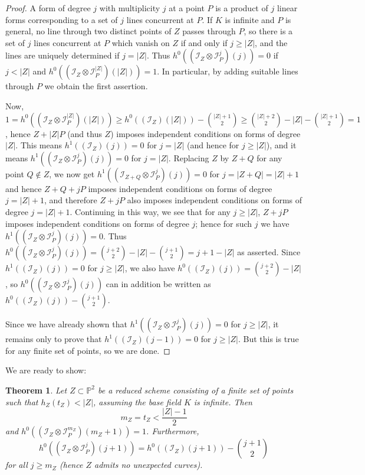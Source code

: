 \documentclass[12pt]{amsart}
\numberwithin{equation}{section}
\newtheorem{theorem}{Theorem}[section]
\theoremstyle{definition}
\begin{document}
\begin{proof} A form of degree $j$ with multiplicity $j$ at a point $P$ is a product of $j$ 
linear forms corresponding to  a set of $j$ lines concurrent at $P$. If $K$ is infinite and 
$P$ is general, no line through two distinct points of $Z$ passes  through $P$, so
there is a set of $j$ lines concurrent at $P$ which vanish on $Z$ if and only if $j\geq |Z|$, 
and the lines are uniquely determined if $j=|Z|$. 
Thus $h^0((\mathcal I_Z \otimes \mathcal I_P^{j})(j)) = 0$ if $j<|Z|$ and
$h^0((\mathcal I_Z \otimes \mathcal I_P^{|Z|})(|Z|)) = 1$. In particular, by adding suitable lines through $P$ we obtain the first assertion.

Now, 
$1=h^0((\mathcal I_Z \otimes \mathcal I_P^{|Z|})(|Z|))\geq 
h^0((\mathcal I_Z)(|Z|))-\binom{|Z|+1}{2}\geq \binom{|Z|+2}{2}-|Z|-\binom{|Z|+1}{2} = 1$,
hence $Z+|Z|P$ (and thus $Z$) imposes independent conditions on forms of degree $|Z|$.
This means $h^1((\mathcal I_Z)(j)) = 0$ for $j=|Z|$ (and hence for $j\geq |Z|$), and it means
$h^1((\mathcal I_Z \otimes \mathcal I_P^j)(j)) = 0$ for $j = |Z|$.
Replacing $Z$ by $Z+Q$ for any point $Q\notin Z$, we now get
$h^1((\mathcal I_{Z+Q} \otimes \mathcal I_P^j)(j)) = 0$ for $j = |Z+Q|=|Z|+1$ and hence
$Z+Q+jP$ imposes independent conditions on forms of degree $j=|Z|+1$, and therefore
$Z+jP$ also imposes independent conditions on forms of degree $j=|Z|+1$.
Continuing in this way, we see that for any $j \geq |Z|$, $Z + jP$ imposes independent conditions on forms of degree $j$; hence for such $j$ we have $h^1((\mathcal I_Z \otimes \mathcal I_P^j)(j)) = 0$. Thus $h^0((\mathcal I_Z \otimes \mathcal I_P^j)(j)) = \binom{j+2}{2}-|Z|-\binom{j+1}{2}=j+1-|Z|$  as asserted. Since $h^1((\mathcal I_Z)(j)) = 0$ for $j\geq|Z|$, we also have
$h^0((\mathcal I_Z)(j)) = \binom{j+2}{2}-|Z|$, so $h^0((\mathcal I_Z \otimes \mathcal I_P^j)(j))$
can in addition be written as $h^0((\mathcal I_Z)(j)) -\binom{j+1}{2}$.

Since we have already shown that $h^1((\mathcal I_Z \otimes \mathcal I_P^j)(j)) = 0$ for $j \geq |Z|$, it remains only to prove that $h^1((\mathcal I_Z)(j-1)) = 0$ for $j \geq |Z|$. But this is true for any finite set of points, so we are done.
\end{proof} 

We are ready to show: 

\begin{theorem} \label{thm:tZ = dZ}
Let $Z \subset { \ensuremath{\mathbb{P}}}^2$ be a reduced scheme  consisting of a finite set of points
such that $h_Z (t_Z) < |Z|$, assuming the base field $K$ is infinite. 
Then 
\[
m_Z = t_Z < \frac{|Z| - 1}{2}
\]
and $h^0((\mathcal I_Z \otimes \mathcal I_P^{m_Z})(m_Z + 1)) = 1$.
Furthermore, 
\[
h^0((\mathcal I_Z \otimes \mathcal I_P^{j})(j + 1)) = h^0((\mathcal I_Z)(j + 1))-\binom{j+1}{2}
\]
for all $j\geq m_Z$ (hence $Z$ admits no unexpected curves).
\end{theorem}
\end{document}
